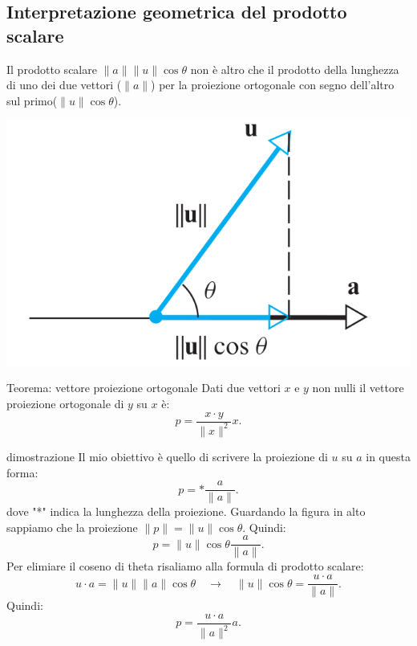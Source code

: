 \documentclass[x11names]{article}
\begin{document}
\subsection{Interpretazione geometrica del prodotto scalare}
Il prodotto scalare $\|a\|\|u\|\cos{\theta}$ non è altro che il prodotto della lunghezza di uno dei due vettori ($\|a\|$) per la proiezione ortogonale con segno dell'altro sul primo($\|u\|\cos{\theta}$).

\begin{center}
\includegraphics[scale=0.25]{figures/proj.png}
\end{center}


\begin{center}
\colorbox{myred}{\begin{minipage}{5.75in}
\begin{redes}{Teorema: vettore proiezione ortogonale}
Dati due vettori $x$ e $y$ non nulli il vettore proiezione ortogonale di $y$ su $x$ è:
\[
p = \frac{x\cdot y}{\|x\|^2}x
.\] 
\end{redes}
\end{minipage}}        
\end{center}

\begin{es}{dimostrazione}
Il mio obiettivo è quello di scrivere la proiezione di $u$ su $a$ in questa forma:
\[
p = * \frac{a}{\|a\|}
.\] 
dove "*" indica la lunghezza della proiezione.
Guardando la figura in alto sappiamo che la proiezione $\|p\| = \|u\|\cos{\theta}$. Quindi:
\[
p = \|u\|\cos{\theta} \frac{a}{\|a\|} 
.\] 
Per elimiare il coseno di theta risaliamo alla formula di prodotto scalare:
\[
u \cdot a = \|u\|\|a\|\cos{\theta} \quad \longrightarrow \quad \|u\|\cos{\theta} = \frac{u\cdot a}{\|a\|}
.\] 
Quindi:
\[
p = \frac{u\cdot a}{\|a\|^2}a
.\] 
\end{es}
\end{document}
